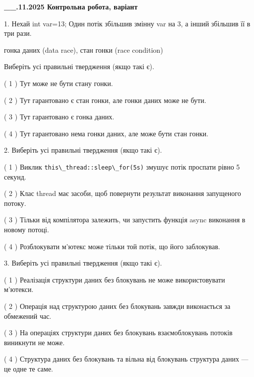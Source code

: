 \documentclass[12pt, ukrainian]{article}
\def\code#1{\Verb!#1!}
\begin{document}
\newpage
\begin {large}

\textbf{\_\_.11.2025 Контрольна робота, варіант  }\par


{
1. Нехай int var=13; Один потік збільшив змінну var на 3, а інший збільшив її в три рази.

гонка даних (data race), стан гонки (race condition)

Виберіть усі правильні твердження (якщо такі є).\par
\vspace{2mm}
( 1 ) Тут може не бути стану гонки.%

( 2 ) Тут гарантовано є стан гонки, але гонки даних може не бути.%

( 3 ) Тут гарантовано є гонка даних.%

( 4 ) Тут гарантовано нема гонки даних, але може бути стан гонки.%


2. Виберіть усі правильні твердження (якщо такі є).\par
\vspace{2mm}

( 1 ) Виклик \code{this\_thread::sleep\_for(5s)} змушує потік проспати рівно 5 секунд.%

( 2 ) Клас thread має засоби, щоб повернути результат виконання запущеного потоку.%

( 3 ) Тільки від компілятора залежить, чи запустить функція async виконання в новому потоці.%

( 4 ) Розблокувати м’ютекс може тільки той потік, що його заблокував.%


3. Виберіть усі правильні твердження (якщо такі є).\par
\vspace{2mm}

( 1 ) Реалізація структури даних без блокувань не може використовувати м’ютекси.%

( 2 ) Операція над структурою даних без блокувань завжди виконається за обмежений час.%

( 3 ) На операціях структури даних без блокувань взаємоблокувань потоків виникнути не може.%

( 4 ) Структура даних без блокувань та вільна від блокувань структура даних --- це одне те саме.%


}
\end{large}
\end{document}
